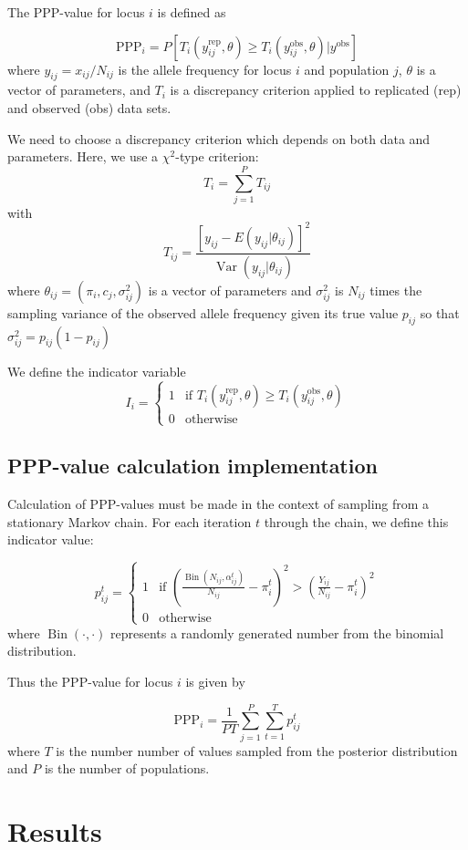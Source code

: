\documentclass[a4paper,12pt]{article}
\begin{document}
The PPP-value for locus $i$ is defined as

$$\text{PPP}_i = 
P\left[T_i(y_{ij}^{\text{rep}},\theta)\geq T_i(y_{ij}^{\text{obs}},\theta)|y^{\text{obs}}\right]
$$
where $y_{ij}=x_{ij}/N_{ij}$ is the allele frequency for locus $i$ and
population $j$, $\theta$ is a vector of parameters, and $T_i$ is a
discrepancy criterion applied to replicated (rep) and observed (obs)
data sets.

We need to choose a discrepancy criterion which depends on both data
and parameters. Here, we use a $\chi^2$-type criterion:
$$T_i = \sum_{j=1}^P T_{ij}$$
with
$$T_{ij} = 
\frac{\left[y_{ij} - E(y_{ij}|\theta_{ij})\right]^2}{
  \operatorname{Var}(y_{ij}|\theta_{ij})}$$ where
$\theta_{ij}=(\pi_i,c_j,\sigma_{ij}^2)$ is a vector of parameters and
$\sigma_{ij}^2$ is $N_{ij}$ times the sampling variance of the observed
allele frequency given its true value $p_{ij}$ so that
$\sigma_{ij}^2=p_{ij}(1-p_{ij})$

We define the indicator variable
$$
I_i =
\begin{cases}
  1 & \text{if }T_i(y_{ij}^{\text{rep}},\theta)\geq T_i(y_{ij}^{\text{obs}},\theta) \\
  0 & \text{otherwise}
\end{cases}
$$

\subsection{PPP-value calculation implementation}

Calculation of PPP-values must be made in the context of sampling from
a stationary Markov chain. For each iteration $t$ through the chain,
we define this indicator value:

$$
p_{ij}^t =
\begin{cases} 
1 & \text{if }\left(
\frac{\operatorname{Bin}(N_{ij},\alpha_{ij}^t)}{N_{ij}} - \pi_i^t
\right)^2
>
\left(
\frac{Y_{ij}}{N_{ij}} - \pi_i^t
\right)^2\\
0 & \text{otherwise}
\end{cases}
$$
where $\operatorname{Bin}(\cdot,\cdot)$ represents a randomly generated
number from the binomial distribution.

Thus the PPP-value for locus $i$ is given by

$$
\text{PPP}_i = \frac 1 {PT} \sum_{j=1}^P \sum_{t=1}^T p_{ij}^t
$$
where $T$ is the number number of values sampled from the posterior
distribution and $P$ is the number of populations.
\section{Results}
\end{document}

